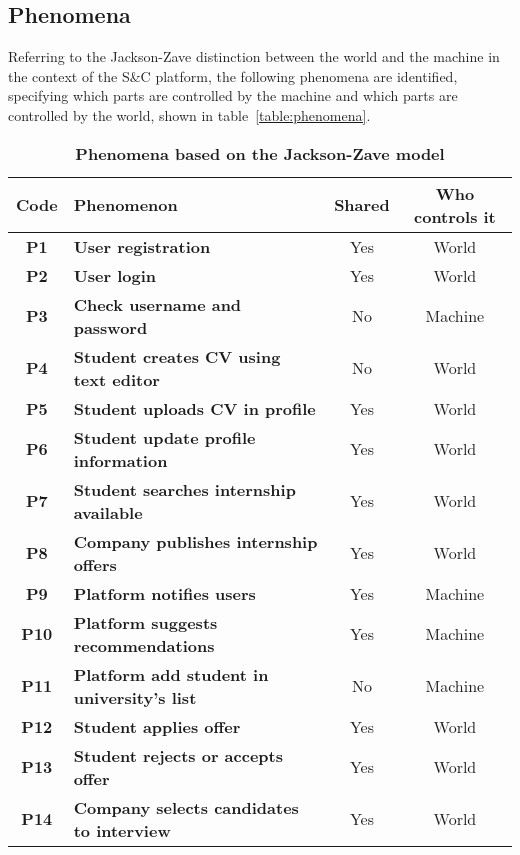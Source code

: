 \subsection{Phenomena}
Referring to the Jackson-Zave distinction between the world and the machine in the context of the S\&C platform, the following phenomena are 
identified, specifying which parts are controlled by the machine and which parts are controlled by the world, shown in table~\ref{table:phenomena}.

\begin{table}[H]
    \caption*{\textbf{Phenomena based on the Jackson-Zave model}}
    \centering
    \begin{tabular}{|c|p{20em}|c|c|}
    \hline
    \rowcolor{bluepoli!40} %
    \textbf{Code} & \textbf{Phenomenon} & \textbf{Shared} & \textbf{Who controls it} \T\B \\
    \hline
    \textbf{P1} & \textbf{User registration} & Yes & World \T\B \\
    \textbf{P2} & \textbf{User login} & Yes & World \T\B\\
    \textbf{P3} & \textbf{Check username and password} & No & Machine \T\B\\
    \textbf{P4} & \textbf{Student creates CV using text editor} & No & World  \T\B \\
    \textbf{P5} & \textbf{Student uploads CV in profile} & Yes & World  \T\B \\
    \textbf{P6} & \textbf{Student update profile information} & Yes & World  \T\B \\
    \textbf{P7} & \textbf{Student searches internship available} & Yes & World \T\B\\
    \textbf{P8} & \textbf{Company publishes internship offers} & Yes & World \T\B \\
    \textbf{P9} & \textbf{Platform notifies users} & Yes & Machine \B\\
    \textbf{P10} & \textbf{Platform suggests recommendations} & Yes & Machine \T\B \\
    \textbf{P11} & \textbf{Platform add student in university's list} & No & Machine \T\B \\
    \textbf{P12} & \textbf{Student applies offer} & Yes & World \B\\
    \textbf{P13} & \textbf{Student rejects or accepts offer} & Yes & World \T\B \\
    \textbf{P14} & \textbf{Company selects candidates to interview} & Yes & World \T\B\\

\end{tabular}
\end{table}
